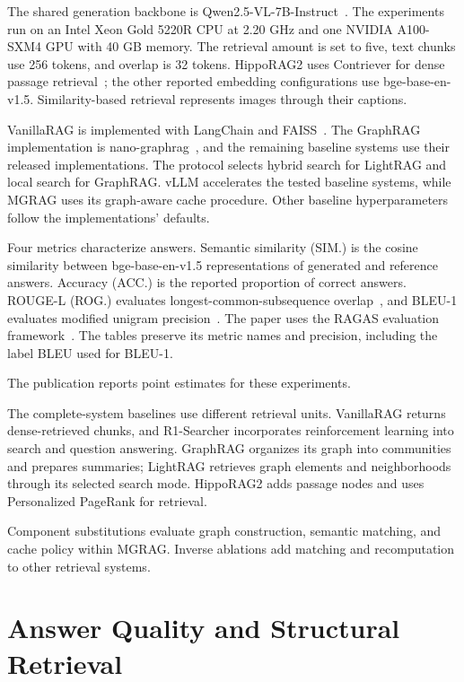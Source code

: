 

The shared generation backbone is Qwen2.5-VL-7B-Instruct~\cite{mgrag-bai2025qwen2}. The experiments run on an Intel Xeon Gold 5220R CPU at 2.20 GHz and one NVIDIA A100-SXM4 GPU with 40 GB memory. The retrieval amount is set to five, text chunks use 256 tokens, and overlap is 32 tokens. HippoRAG2 uses Contriever for dense passage retrieval~\cite{mgrag-izacardunsupervised}; the other reported embedding configurations use bge-base-en-v1.5. Similarity-based retrieval represents images through their captions.

VanillaRAG is implemented with LangChain and FAISS~\cite{mgrag-douze2024faiss}. The GraphRAG implementation is nano-graphrag~\cite{mgrag-nanographrag}, and the remaining baseline systems use their released implementations. The protocol selects hybrid search for LightRAG and local search for GraphRAG. vLLM accelerates the tested baseline systems, while MGRAG uses its graph-aware cache procedure. Other baseline hyperparameters follow the implementations' defaults.

Four metrics characterize answers. Semantic similarity (SIM.) is the cosine similarity between bge-base-en-v1.5 representations of generated and reference answers. Accuracy (ACC.) is the reported proportion of correct answers. ROUGE-L (ROG.) evaluates longest-common-subsequence overlap~\cite{mgrag-lin2004rouge}, and BLEU-1 evaluates modified unigram precision~\cite{mgrag-papineni2002bleu}. The paper uses the RAGAS evaluation framework~\cite{mgrag-es2024ragas}. The tables preserve its metric names and precision, including the label BLEU used for BLEU-1.

The publication reports point estimates for these experiments.

The complete-system baselines use different retrieval units. VanillaRAG returns dense-retrieved chunks, and R1-Searcher incorporates reinforcement learning into search and question answering. GraphRAG organizes its graph into communities and prepares summaries; LightRAG retrieves graph elements and neighborhoods through its selected search mode. HippoRAG2 adds passage nodes and uses Personalized PageRank for retrieval.

Component substitutions evaluate graph construction, semantic matching, and cache policy within MGRAG. Inverse ablations add matching and recomputation to other retrieval systems.

\section{Answer Quality and Structural Retrieval}
\label{sec:mgrag:results}


